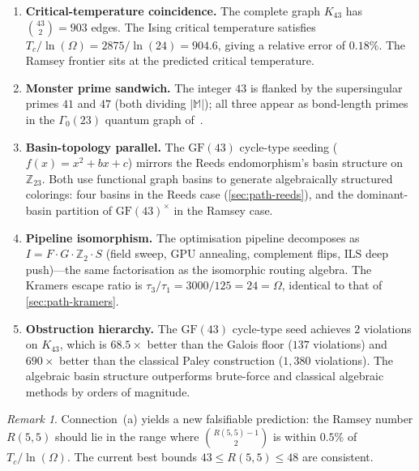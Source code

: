 \documentclass[11pt,a4paper]{article}
\theoremstyle{plain}
\theoremstyle{remark}
\newtheorem{remark}[theorem]{Remark}
\renewcommand{\Omega}{\varOmega}
\newcommand{\Z}{\mathbb{Z}}
\newcommand{\GF}{\mathrm{GF}}
\begin{document}
\begin{enumerate}[label=(\alph*),itemsep=2pt]
\item \textbf{Critical-temperature coincidence.}
  The complete graph $K_{43}$ has $\binom{43}{2}=903$ edges.
  The Ising critical temperature satisfies
  $T_c/\!\ln(\Omega) = 2875/\!\ln(24) = 904.6$, giving a relative
  error of $0.18\%$.  The Ramsey frontier sits at the predicted
  critical temperature.

\item \textbf{Monster prime sandwich.}
  The integer $43$ is flanked by the supersingular primes $41$ and $47$
  (both dividing $|\mathbb{M}|$); all three appear as bond-length
  primes in the $\Gamma_0(23)$ quantum graph of~\cite{DHR2026a}.

\item \textbf{Basin-topology parallel.}
  The $\GF(43)$ cycle-type seeding ($f(x)=x^2+bx+c$) mirrors the Reeds
  endomorphism's basin structure on~$\Z_{23}$.  Both use functional
  graph basins to generate algebraically structured colorings:
  four basins in the Reeds case (\cref{sec:path-reeds}), and the
  dominant-basin partition of $\GF(43)^\times$ in the Ramsey case.

\item \textbf{Pipeline isomorphism.}
  The optimisation pipeline decomposes as $I = F\cdot G\cdot\Z_2\cdot S$
  (field sweep, GPU annealing, complement flips, ILS deep push)---the
  same factorisation as the isomorphic routing algebra.  The Kramers
  escape ratio is $\tau_3/\tau_1 = 3000/125 = 24 = \Omega$, identical
  to that of \cref{sec:path-kramers}.

\item \textbf{Obstruction hierarchy.}
  The $\GF(43)$ cycle-type seed achieves $2$ violations on $K_{43}$,
  which is $68.5\times$ better than the Galois floor ($137$ violations)
  and $690\times$ better than the classical Paley construction
  ($1{,}380$ violations).  The algebraic basin structure outperforms
  brute-force and classical algebraic methods by orders of magnitude.
\end{enumerate}

\begin{remark}\label{rem:ramsey-prediction}
Connection~(a) yields a new falsifiable prediction: the Ramsey number
$R(5,5)$ should lie in the range where $\binom{R(5,5)-1}{2}$ is within
$0.5\%$ of $T_c/\!\ln(\Omega)$.  The current best bounds
$43\leq R(5,5)\leq 48$ are consistent.
\end{remark}
\end{document}
